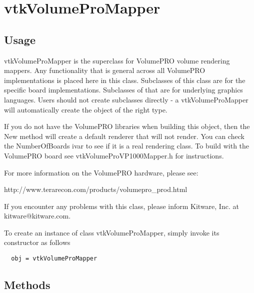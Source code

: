 \section{vtkVolumeProMapper}

\subsection{Usage}

 vtkVolumeProMapper is the superclass for VolumePRO volume rendering mappers.
 Any functionality that is general across all VolumePRO implementations is
 placed here in this class. Subclasses of this class are for the specific
 board implementations. Subclasses of that are for underlying graphics 
 languages. Users should not create subclasses directly - 
 a vtkVolumeProMapper will automatically create the object of the right 
 type.

 If you do not have the VolumePRO libraries when building this object, then
 the New method will create a default renderer that will not render.
 You can check the NumberOfBoards ivar to see if it is a real rendering class.
 To build with the VolumePRO board see vtkVolumeProVP1000Mapper.h 
 for instructions.

 For more information on the VolumePRO hardware, please see:

   http://www.terarecon.com/products/volumepro\_prod.html

 If you encounter any problems with this class, please inform Kitware, Inc.
 at kitware@kitware.com.



To create an instance of class vtkVolumeProMapper, simply
invoke its constructor as follows
\begin{verbatim}
  obj = vtkVolumeProMapper
\end{verbatim}
\subsection{Methods}

